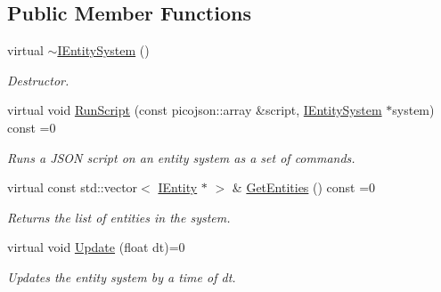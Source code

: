 \subsection*{Public Member Functions}
\begin{DoxyCompactItemize}
\item 
\mbox{\label{classentity__project_1_1IEntitySystem_ab4ba3624f6f8c76b6040874dad2f9e6f}} 
virtual \hyperlink{classentity__project_1_1IEntitySystem_ab4ba3624f6f8c76b6040874dad2f9e6f}{$\sim$\+I\+Entity\+System} ()
\begin{DoxyCompactList}\small\item\em Destructor. \end{DoxyCompactList}\item 
virtual void \hyperlink{classentity__project_1_1IEntitySystem_a57a31878f9ae43f2ac3e70aa1903b8ec}{Run\+Script} (const picojson\+::array \&script, \hyperlink{classentity__project_1_1IEntitySystem}{I\+Entity\+System} $\ast$system) const =0
\begin{DoxyCompactList}\small\item\em Runs a J\+S\+ON script on an entity system as a set of commands. \end{DoxyCompactList}\item 
\mbox{\label{classentity__project_1_1IEntitySystem_a43255ef96f8504e2a536d10fd018e52a}} 
virtual const std\+::vector$<$ \hyperlink{classentity__project_1_1IEntity}{I\+Entity} $\ast$ $>$ \& \hyperlink{classentity__project_1_1IEntitySystem_a43255ef96f8504e2a536d10fd018e52a}{Get\+Entities} () const =0
\begin{DoxyCompactList}\small\item\em Returns the list of entities in the system. \end{DoxyCompactList}\item 
\mbox{\label{classentity__project_1_1IEntitySystem_ada758b54da573bb18372880633544c20}} 
virtual void \hyperlink{classentity__project_1_1IEntitySystem_ada758b54da573bb18372880633544c20}{Update} (float dt)=0
\begin{DoxyCompactList}\small\item\em Updates the entity system by a time of dt. \end{DoxyCompactList}\end{DoxyCompactItemize}


